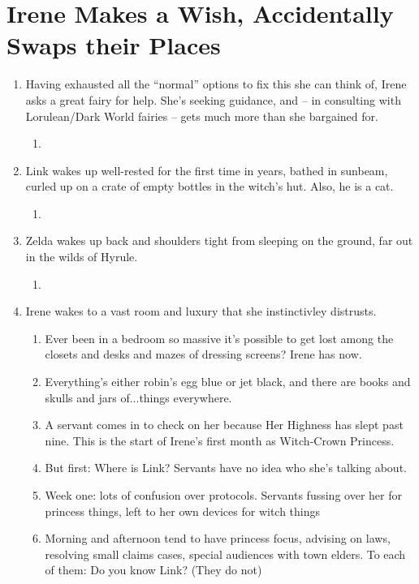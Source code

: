 \documentclass[../FGP.tex]{subfiles}
\begin{document}
\section{Irene Makes a Wish, Accidentally Swaps their Places}
\begin{enumerate}
\item Having exhausted all the ``normal'' options to fix this she can think of, Irene asks a great fairy for help. She's seeking guidance, and -- in consulting with Lorulean/Dark World fairies -- gets much more than she bargained for.\begin{enumerate} \item \end{enumerate}
\item Link wakes up well-rested for the first time in years, bathed in sunbeam, curled up on a crate of empty bottles in the witch's hut. Also, he is a cat.\begin{enumerate} \item \end{enumerate}
\item Zelda wakes up back and shoulders tight from sleeping on the ground, far out in the wilds of Hyrule.\begin{enumerate} \item \end{enumerate}
\item Irene wakes to a vast room and luxury that she instinctivley distrusts. \begin{enumerate} \item Ever been in a bedroom so massive it's possible to get lost among the closets and desks and mazes of dressing screens? Irene has now.
\item Everything's either robin's egg blue or jet black, and there are books and skulls and jars of...things everywhere.
\item A servant comes in to check on her because Her Highness has slept past nine. This is the start of Irene's first month as Witch-Crown Princess. 
\item But first: Where is Link? Servants have no idea who she's talking about.
\item Week one: lots of confusion over protocols. Servants fussing over her for princess things, left to her own devices for witch things
\item Morning and afternoon tend to have princess focus, advising on laws, resolving small claims cases, special audiences with town elders. To each of them: Do you know Link? (They do not)

\end{enumerate}
\end{enumerate}
\end{document}
